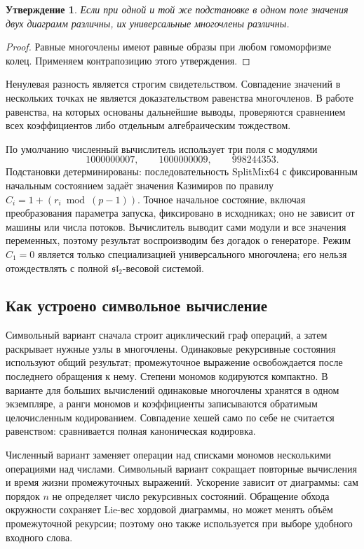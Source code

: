 \documentclass[11pt,a4paper]{article}
\numberwithin{equation}{section}
\newtheorem{proposition}[theorem]{Утверждение}
\theoremstyle{definition}
\theoremstyle{remark}
\newcommand{\sll}{\mathfrak{sl}}
\begin{document}
\begin{proposition}\label{prop:evaluation}
Если при одной и той же подстановке в одном поле значения двух
диаграмм различны, их универсальные многочлены различны.
\end{proposition}
\begin{proof}
Равные многочлены имеют равные образы при любом гомоморфизме колец.
Применяем контрапозицию этого утверждения.
\end{proof}

Ненулевая разность является строгим свидетельством. Совпадение значений
в нескольких точках не является доказательством равенства многочленов.
В работе равенства, на которых основаны дальнейшие выводы, проверяются
сравнением всех коэффициентов либо отдельным алгебраическим тождеством.

По умолчанию численный вычислитель использует три поля с модулями
\[
 1000000007,\qquad1000000009,\qquad998244353.
\]
Подстановки детерминированы: последовательность SplitMix64 с фиксированным
начальным состоянием задаёт значения Казимиров по правилу
$C_i=1+(r_i\bmod(p-1))$. Точное начальное состояние, включая преобразования
параметра запуска, фиксировано в исходниках; оно не зависит от машины
или числа потоков. Вычислитель выводит сами модули и все значения
переменных, поэтому результат воспроизводим без догадок о генераторе.
Режим $C_1=0$ является только специализацией универсального многочлена;
его нельзя отождествлять с полной $\sll_2$-весовой системой.

\subsection{Как устроено символьное вычисление}

Символьный вариант сначала строит ациклический граф операций, а затем
раскрывает нужные узлы в многочлены. Одинаковые рекурсивные состояния
используют общий результат; промежуточное выражение освобождается после
последнего обращения к нему. Степени мономов кодируются компактно.
В варианте для больших вычислений одинаковые многочлены хранятся в одном
экземпляре, а ранги мономов и коэффициенты записываются обратимым
целочисленным кодированием. Совпадение хешей само по себе не считается
равенством: сравнивается полная каноническая кодировка.

Численный вариант заменяет операции над списками мономов несколькими
операциями над числами. Символьный вариант сокращает повторные вычисления
и время жизни промежуточных выражений. Ускорение зависит от диаграммы:
сам порядок $n$ не определяет число рекурсивных состояний. Обращение
обхода окружности сохраняет Lie-вес хордовой диаграммы, но может менять
объём промежуточной рекурсии; поэтому оно также используется при выборе
удобного входного слова.
\end{document}
